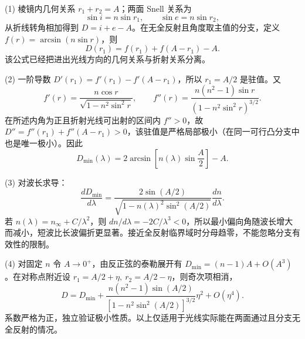 (1) 棱镜内几何关系 \(r_1+r_2=A\)；两面 Snell 关系为
\[
\sin i=n\sin r_1,\qquad \sin e=n\sin r_2,
\]
从折线转角相加得到 \(D=i+e-A\)。在无全反射且角度取主值的分支，定义 \(f(r)=\arcsin(n\sin r)\)，则
\[
D(r_1)=f(r_1)+f(A-r_1)-A.
\]
该公式已经把进出光线方向的几何关系与折射关系分离。

(2) 一阶导数 \(D'(r_1)=f'(r_1)-f'(A-r_1)\)，所以 \(r_1=A/2\) 是驻值。又
\[
f'(r)=\frac{n\cos r}{\sqrt{1-n^2\sin^2r}},\qquad
f''(r)=\frac{n(n^2-1)\sin r}{(1-n^2\sin^2r)^{3/2}}.
\]
在所述内角为正且折射光线可出射的区间内 \(f''>0\)，故 \(D''=f''(r_1)+f''(A-r_1)>0\)，该驻值是严格局部极小（在同一可行凸分支中也是唯一极小）。因此
\[
D_{\min}(\lambda)=2\arcsin\!\left[n(\lambda)\sin\frac A2\right]-A.
\]

(3) 对波长求导：
\[
\frac{dD_{\min}}{d\lambda}
=\frac{2\sin(A/2)}{\sqrt{1-n(\lambda)^2\sin^2(A/2)}}\frac{dn}{d\lambda}.
\]
若 \(n(\lambda)=n_\infty+C/\lambda^2\)，则 \(dn/d\lambda=-2C/\lambda^3<0\)，所以最小偏向角随波长增大而减小，短波比长波偏折更显著。接近全反射临界域时分母趋零，不能忽略分支有效性的限制。

(4) 对固定 \(n\) 令 \(A\to0^+\)，由反正弦的泰勒展开有 \(D_{\min}=(n-1)A+O(A^3)\)。在对称点附近设 \(r_1=A/2+\eta,\ r_2=A/2-\eta\)，则奇次项相消，
\[
D=D_{\min}
+\frac{n(n^2-1)\sin(A/2)}
{[1-n^2\sin^2(A/2)]^{3/2}}\eta^2
+O(\eta^4).
\]
系数严格为正，独立验证极小性质。以上仅适用于光线实际能在两面通过且分支无全反射的情况。
